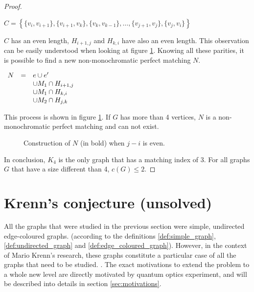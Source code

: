 \begin{proof}
\begin{itemize}
            \begin{center}
                $C = \left\{
                    \{v_i, v_{i + 1}\}, \{v_{i+1}, v_k\}, \{v_k, v_{k - 1}\}, \dots, \{v_{j+1}, v_j\}, \{v_j, v_i\}
                \right\}$
            \end{center}
            
            $C$ has an even length, $H_{i+1, j}$ and $H_{k, i}$ have also an even length. This observation can be easily understood when looking at figure \ref{fig:proof_simplified_even}. Knowing all these parities, it is possible to find a new non-monochromatic perfect matching $N$.
            
            \begin{center}
                $\begin{array}{r c l}
                    N & = & e \cup e' \\
                      &   & \cup M_1 \cap H_{i+1, j} \\
                      &   & \cup M_1 \cap H_{k, i} \\
                      &   & \cup M_2 \cap H_{j, k}
                \end{array}$
            \end{center}
            
            This process is shown in figure \ref{fig:proof_simplified_even}. If $G$ has more than 4 vertices, $N$ is a non-monochromatic perfect matching and can not exist.
            
            \begin{figure}[H]
                \caption{Construction of $N$ (in bold) when $j - i$ is even.}
                \label{fig:proof_simplified_even}
            \end{figure}
    \end{itemize}

    In conclusion, $K_4$ is the only graph that has a matching index of 3. For all graphs $G$ that have a size different than 4, $c(G) \leq 2$.
\end{proof}


\section{Krenn's conjecture (unsolved)}
\label{sec:krenn_conjecture}

All the graphs that were studied in the previous section were simple, undirected edge-coloured graphs. (according to the definitions \ref{def:simple_graph}, \ref{def:undirected_graph} and \ref{def:edge_coloured_graph}). However, in the context of Mario Krenn's research, these graphs constitute a particular case of all the graphs that need to be studied. \cite{Krenn_2017} \cite{wordpress}. The exact motivations to extend the problem to a whole new level are directly motivated by quantum optics experiment, and will be described into details in section \ref{sec:motivations}. 

